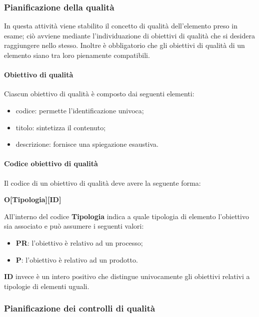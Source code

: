 \subsubsection{Pianificazione della qualità}
\label{ssub:pianificazione_qualita}

In questa attività viene stabilito il concetto di qualità dell'elemento preso in esame; ciò avviene mediante l'individuazione di obiettivi 
di qualità che si desidera raggiungere nello stesso. Inoltre è obbligatorio che gli obiettivi di qualità di un elemento siano tra loro 
pienamente compatibili.

\paragraph{Obiettivo di qualità}
\label{par:obiettivo_qualita}

Ciascun obiettivo di qualità è composto dai seguenti elementi: 
\begin{itemize}
	\item codice: permette l'identificazione univoca;
	\item titolo: sintetizza il contenuto;
	\item descrizione: fornisce una spiegazione esaustiva.
\end{itemize}

\paragraph{Codice obiettivo di qualità}
\label{par:codice_obiettivo}

Il codice di un obiettivo di qualità deve avere la seguente forma:
\begin{center}
	\textbf{O[Tipologia][ID]}
\end{center}
All'interno del codice \textbf{Tipologia} indica a quale tipologia di elemento l'obiettivo sia associato e può assumere i seguenti valori:
\begin{itemize}
	\item \textbf{PR}: l'obiettivo è relativo ad un processo;
	\item \textbf{P}: l'obiettivo è relativo ad un prodotto.
\end{itemize}
\textbf{ID} invece è un intero positivo che distingue univocamente gli obiettivi relativi a tipologie di elementi uguali.

\subsubsection{Pianificazione dei controlli di qualità}
\label{ssub:pianificazione_controlli_qualita}

